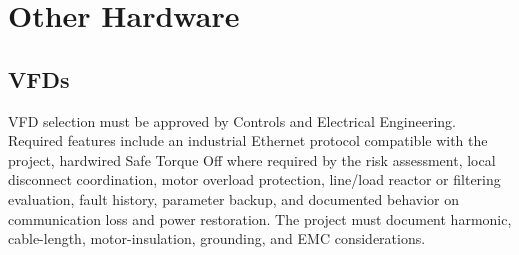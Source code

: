\section{Other Hardware}
\subsection{VFDs}\label{sec:vfd}
VFD selection must be approved by Controls and Electrical Engineering. Required features include an industrial Ethernet protocol compatible with the project, hardwired Safe Torque Off where required by the risk assessment, local disconnect coordination, motor overload protection, line/load reactor or filtering evaluation, fault history, parameter backup, and documented behavior on communication loss and power restoration. The project must document harmonic, cable-length, motor-insulation, grounding, and EMC considerations.

